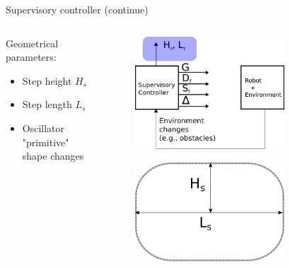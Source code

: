 \documentclass{beamer}
\begin{document}
\begin{frame}{Supervisory controller (continue)}
		\begin{columns}
		\hspace{1cm}
		\begin{column}{0.5\textwidth}
		Geometrical parameters:
		\begin{itemize}
			\setlength\itemsep{3em}
			\item Step height $H_s$
			\item Step length $L_s$
			\item Oscillator "primitive" shape changes
		\end{itemize}	
		
		\end{column}
		\begin{column}{0.5\textwidth}
			\begin{figure}[ht]\centering
				\includegraphics[width=0.75\textwidth]{images/Supervisory.pdf}
			\end{figure}
			\begin{figure}[ht]\centering
				\includegraphics[width=0.75\textwidth]{images/PrimitiveShape.pdf}
			\end{figure}	
		\end{column}
		\end{columns}
\end{frame}
\end{document}
